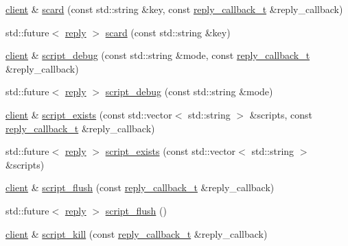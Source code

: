 \begin{DoxyCompactItemize}
\item 
\hyperlink{classcpp__redis_1_1client}{client} \& \hyperlink{classcpp__redis_1_1client_a4be40b061ee915a236218e5e2fd76206}{scard} (const std\+::string \&key, const \hyperlink{classcpp__redis_1_1client_a061a1140d36d2eaeda82b09a0bb3f9f2}{reply\+\_\+callback\+\_\+t} \&reply\+\_\+callback)
\item 
std\+::future$<$ \hyperlink{classcpp__redis_1_1reply}{reply} $>$ \hyperlink{classcpp__redis_1_1client_a089148ca908f563e7b73649aac3bd01e}{scard} (const std\+::string \&key)
\item 
\hyperlink{classcpp__redis_1_1client}{client} \& \hyperlink{classcpp__redis_1_1client_a6e83ee14e50aef360d7246c2da63b037}{script\+\_\+debug} (const std\+::string \&mode, const \hyperlink{classcpp__redis_1_1client_a061a1140d36d2eaeda82b09a0bb3f9f2}{reply\+\_\+callback\+\_\+t} \&reply\+\_\+callback)
\item 
std\+::future$<$ \hyperlink{classcpp__redis_1_1reply}{reply} $>$ \hyperlink{classcpp__redis_1_1client_a336d8dd0da70700d67bac5e71484efff}{script\+\_\+debug} (const std\+::string \&mode)
\item 
\hyperlink{classcpp__redis_1_1client}{client} \& \hyperlink{classcpp__redis_1_1client_a6fcb8af437a9ae919af745cd0a0fa313}{script\+\_\+exists} (const std\+::vector$<$ std\+::string $>$ \&scripts, const \hyperlink{classcpp__redis_1_1client_a061a1140d36d2eaeda82b09a0bb3f9f2}{reply\+\_\+callback\+\_\+t} \&reply\+\_\+callback)
\item 
std\+::future$<$ \hyperlink{classcpp__redis_1_1reply}{reply} $>$ \hyperlink{classcpp__redis_1_1client_ab55eac91086b7746d731c8405f901016}{script\+\_\+exists} (const std\+::vector$<$ std\+::string $>$ \&scripts)
\item 
\hyperlink{classcpp__redis_1_1client}{client} \& \hyperlink{classcpp__redis_1_1client_a6d885c8b61bfbb74245be8d040813637}{script\+\_\+flush} (const \hyperlink{classcpp__redis_1_1client_a061a1140d36d2eaeda82b09a0bb3f9f2}{reply\+\_\+callback\+\_\+t} \&reply\+\_\+callback)
\item 
std\+::future$<$ \hyperlink{classcpp__redis_1_1reply}{reply} $>$ \hyperlink{classcpp__redis_1_1client_a44f5707f8487285d69737b7857c436d7}{script\+\_\+flush} ()
\item 
\hyperlink{classcpp__redis_1_1client}{client} \& \hyperlink{classcpp__redis_1_1client_a65abffc1a1669931d5b6715f354b59af}{script\+\_\+kill} (const \hyperlink{classcpp__redis_1_1client_a061a1140d36d2eaeda82b09a0bb3f9f2}{reply\+\_\+callback\+\_\+t} \&reply\+\_\+callback)
\item 

\end{DoxyCompactItemize}
